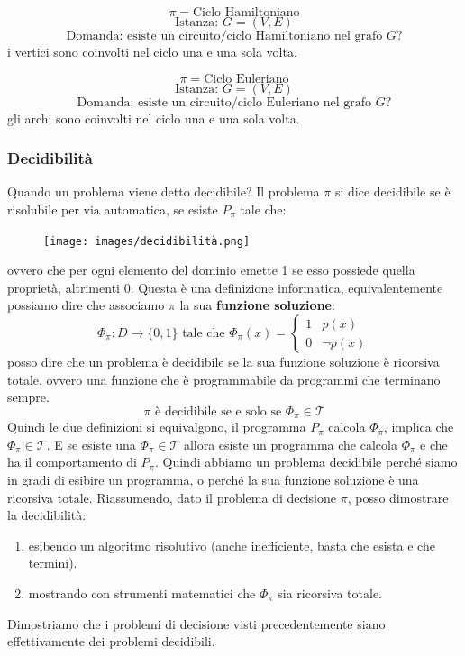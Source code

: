 \documentclass{article}
\begin{document}
$$\pi=\text{Ciclo Hamiltoniano}$$
$$\text{Istanza: }G=(V,E)$$
$$\text{Domanda: esiste un circuito/ciclo Hamiltoniano nel grafo }G?$$
i vertici sono coinvolti nel ciclo una e una sola volta.

$$\pi=\text{Ciclo Euleriano}$$
$$\text{Istanza: }G=(V,E)$$
$$\text{Domanda: esiste un circuito/ciclo Euleriano nel grafo }G?$$
gli archi sono coinvolti nel ciclo una e una sola volta.

\subsubsection{Decidibilità}
Quando un problema viene detto decidibile? Il problema $\pi$ si dice decidibile se è risolubile
per via automatica, se esiste $P_\pi$ tale che:
\begin{figure}[H]
    \centering
    \texttt{[image: images/decidibilità.png]}
\end{figure}
ovvero che per ogni elemento del dominio emette 1 se esso possiede quella proprietà, altrimenti 0.
Questa è una definizione informatica, equivalentemente possiamo dire che associamo
$\pi$ la sua \textbf{funzione soluzione}:
\[
    \Phi_\pi:D\rightarrow\{0,1\}\text{ tale che }\Phi_\pi(x)=
    \begin{cases}
        1 & p(x)       \\
        0 & \lnot p(x)
    \end{cases}
\]
posso dire che un problema è decidibile se la sua funzione soluzione è ricorsiva totale,
ovvero una funzione che è programmabile da programmi che terminano sempre.
$$\pi\text{ è decidibile se e solo se }\Phi_\pi\in\mathcal{T}$$
Quindi le due definizioni si equivalgono, il programma $P_\pi$ calcola $\Phi_\pi$, implica
che $\Phi_\pi\in\mathcal{T}$. E se esiste una $\Phi_\pi\in\mathcal{T}$ allora esiste un
programma che calcola $\Phi_\pi$ e che ha il comportamento di $P_\pi$.
\newline\newline
Quindi abbiamo un problema decidibile perché siamo in gradi di esibire un programma, o perché
la sua funzione soluzione è una ricorsiva totale. Riassumendo, dato il problema di decisione
$\pi$, posso dimostrare la decidibilità:
\begin{enumerate}
    \item esibendo un algoritmo risolutivo (anche inefficiente, basta che esista e che termini).
    \item mostrando con strumenti matematici che $\Phi_\pi$ sia ricorsiva totale.
\end{enumerate}
Dimostriamo che i problemi di decisione visti precedentemente siano effettivamente
dei problemi decidibili.
\end{document}
